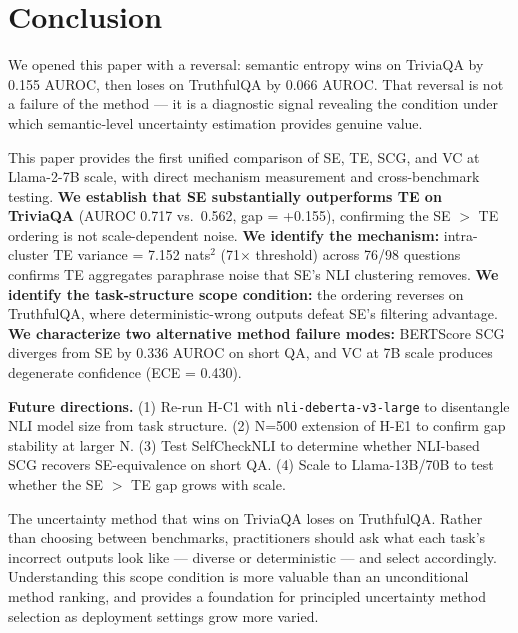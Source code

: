 \section{Conclusion}
\label{sec:conclusion}

We opened this paper with a reversal: semantic entropy wins on TriviaQA by 0.155 AUROC, then loses on TruthfulQA by 0.066 AUROC.
That reversal is not a failure of the method --- it is a diagnostic signal revealing the condition under which semantic-level uncertainty estimation provides genuine value.

This paper provides the first unified comparison of SE, TE, SCG, and VC at Llama-2-7B scale, with direct mechanism measurement and cross-benchmark testing.
\textbf{We establish that SE substantially outperforms TE on TriviaQA} (AUROC 0.717 vs.\ 0.562, gap = +0.155), confirming the SE $>$ TE ordering is not scale-dependent noise.
\textbf{We identify the mechanism:} intra-cluster TE variance = 7.152 nats$^2$ (71$\times$ threshold) across 76/98 questions confirms TE aggregates paraphrase noise that SE's NLI clustering removes.
\textbf{We identify the task-structure scope condition:} the ordering reverses on TruthfulQA, where deterministic-wrong outputs defeat SE's filtering advantage.
\textbf{We characterize two alternative method failure modes:} BERTScore SCG diverges from SE by 0.336 AUROC on short QA, and VC at 7B scale produces degenerate confidence (ECE = 0.430).

\textbf{Future directions.}
(1) Re-run H-C1 with \texttt{nli-deberta-v3-large} to disentangle NLI model size from task structure.
(2) N=500 extension of H-E1 to confirm gap stability at larger N.
(3) Test SelfCheckNLI to determine whether NLI-based SCG recovers SE-equivalence on short QA.
(4) Scale to Llama-13B/70B to test whether the SE $>$ TE gap grows with scale.

The uncertainty method that wins on TriviaQA loses on TruthfulQA.
Rather than choosing between benchmarks, practitioners should ask what each task's incorrect outputs look like --- diverse or deterministic --- and select accordingly.
Understanding this scope condition is more valuable than an unconditional method ranking, and provides a foundation for principled uncertainty method selection as deployment settings grow more varied.
